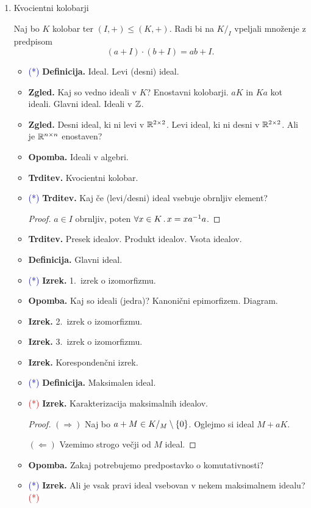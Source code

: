 \begin{enumerate}
    \newpage
    \item Kvocientni kolobarji
    
    Naj bo \(K\) kolobar ter \((I, +) \leq (K, +)\). Radi bi na \(K/_I\) vpeljali množenje z predpisom
    \[(a + I) \cdot (b + I) = ab + I.\]
    \begin{itemize}
        \item \textcolor{blue}{(*)} \textbf{Definicija.} Ideal. Levi (desni) ideal.
        \item \textbf{Zgled.} Kaj so vedno ideali v \(K\)? Enostavni kolobarji. \(aK\) in \(Ka\) kot ideali. Glavni ideal. Ideali v \(\mathbb{Z}\).
        \item \textbf{Zgled.} Desni ideal, ki ni levi v \(\mathbb{R}^{2 \times 2}\). Levi ideal, ki ni desni v \(\mathbb{R}^{2 \times 2}\). Ali je \(\mathbb{R}^{n \times n}\) enostaven?
        \item \textbf{Opomba.} Ideali v algebri.
        \item \textbf{Trditev.} Kvocientni kolobar.
        \item \textcolor{blue}{(*)} \textbf{Trditev.} Kaj če (levi/desni) ideal vsebuje obrnljiv element?
        \begin{proof}
            \(a \in I\) obrnljiv, poten \(\forall x \in K \,.\, x = xa^{-1}a\).
        \end{proof}
        \item \textbf{Trditev.} Presek idealov. Produkt idealov. Vsota idealov.
        \item \textbf{Definicija.} Glavni ideal.
        \item \textcolor{blue}{(*)} \textbf{Izrek.} 1.\ izrek o izomorfizmu.
        \item \textbf{Opomba.} Kaj so ideali (jedra)? Kanonični epimorfizem. Diagram.
        \item \textbf{Izrek.} 2.\ izrek o izomorfizmu.
        \item \textbf{Izrek.} 3.\ izrek o izomorfizmu.
        \item \textbf{Izrek.} Korespondenčni izrek.
        \item \textcolor{blue}{(*)} \textbf{Definicija.} Maksimalen ideal.
        \item \textcolor{red}{(*)} \textbf{Izrek.} Karakterizacija maksimalnih idealov. \todo{*}
        \begin{proof}
            \((\Rightarrow)\) Naj bo \(a + M \in K/_M \setminus \{0\}\). Oglejmo si ideal \(M + aK\).

            \((\Leftarrow)\) Vzemimo strogo večji od \(M\) ideal.
        \end{proof}
        \item \textbf{Opomba.} Zakaj potrebujemo predpostavko o komutativnosti?
        \item \textcolor{blue}{(*)} \textbf{Izrek.} Ali je vsak pravi ideal vsebovan v nekem maksimalnem idealu? \textcolor{red}{(*)}
    \end{itemize}
\end{enumerate}

